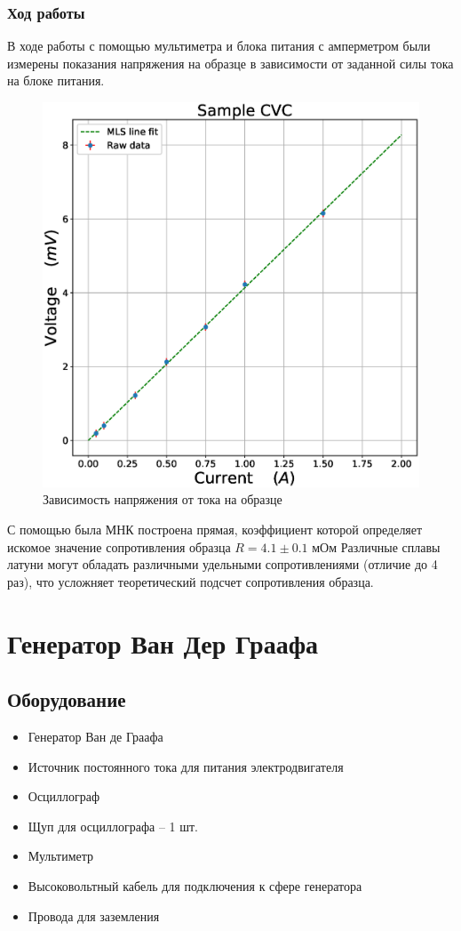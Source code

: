 \documentclass[a4paper,14pt]{extarticle}
\begin{document}
			\subsubsection{Ход работы}
				В ходе работы с помощью мультиметра и блока питания с амперметром были измерены показания напряжения на образце в зависимости от заданной силы тока на блоке питания.
				\begin{figure}[h]
					\centering
					\includegraphics[width=.80\linewidth]{Lab1_3.eps}
					\caption{Зависимость напряжения от тока на образце}
					\label{fig6}
				\end{figure}
				\newpage
				С помощью была МНК построена прямая, коэффициент которой определяет искомое значение сопротивления образца $R = 4.1 \pm 0.1$ мОм
				Различные сплавы латуни могут обладать различными удельными сопротивлениями (отличие до 4 раз), что усложняет теоретический подсчет сопротивления образца.
	\section{Генератор Ван Дер Граафа}
		\subsection{Оборудование}
			\begin{itemize}
				\item Генератор Ван де Граафа 
				\item Источник постоянного тока для питания
				электродвигателя 
				\item Осциллограф 
				\item Щуп для осциллографа – 1 шт. 
				\item Мультиметр 
				\item Высоковольтный кабель для подключения к сфере генератора 
				\item Провода для заземления
			\end{itemize}
\end{document}
